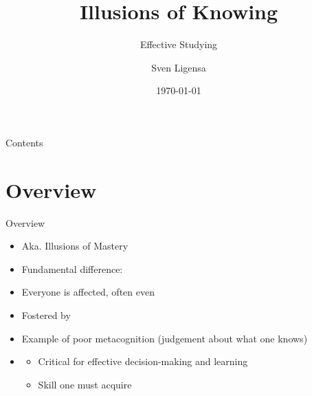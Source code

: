 \documentclass{ercisbeamer}
\title{Illusions of Knowing}
\subtitle{Effective Studying}
\author{Sven Ligensa}
\institute{European Research Center for Information Systems (ERCIS)}
\date{\today}
\begin{document}
\begin{frame}
    \begin{tbox}
        \titlepage
    \end{tbox}
\end{frame}
\setbgimage{}

\begin{frame}{Contents}
    \tableofcontents
\end{frame}

\section{Overview}
\begin{frame}{Overview}
    \pause
    \begin{tbox}
        \begin{itemize}
            \item Aka. Illusions of Mastery
            \item Fundamental difference: 
            \item Everyone is affected, often  even 
            \item Fostered by 
            \item Example of poor metacognition (judgement about what one knows)
            \item {}
            \begin{itemize}
                \item Critical for effective decision-making and learning
                \item Skill one must acquire
            \end{itemize}
        \end{itemize}
    \end{tbox}
\end{frame}
\end{document}
